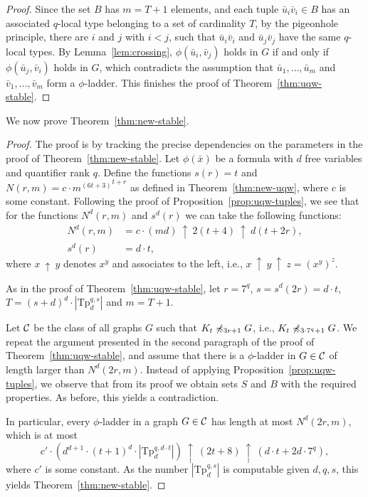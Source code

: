 \begin{proof}
Since the set $B$ has $m=T+1$ elements,
and each tuple $\bar u_i\bar v_i\in B$ has an associated $q$-local type 
belonging to a set of cardinality $T$, 
by the pigeonhole principle, there are $i$ and $j$ 
with $i<j$, such that $\bar u_i\bar v_i$ and $\bar u_j\bar v_j$ 
 have the same $q$-local types. By Lemma~\ref{lem:crossing},   $\phi(\bar u_i,\bar v_j)$ holds in $G$
 if and only if $\phi(\bar u_j,\bar v_i)$ holds in $G$, which contradicts the assumption that $\bar u_1,\ldots,\bar u_m$ and $\bar v_1,\ldots,\bar v_m$ form a $\phi$-ladder.
 This finishes the proof of Theorem~\ref{thm:uqw-stable}.
\end{proof}


We now prove Theorem~\ref{thm:new-stable}.
\begin{proof}
	The proof is by tracking the precise dependencies on the parameters in the proof of Theorem~\ref{thm:new-stable}. 
	Let $\phi(\bar x)$ be a formula with $d$ free variables and quantifier rank $q$.
 Define the functions
	$s(r)=t$ and $N(r,m)=c\cdot {m^{(6t+3)}}^{t+r}$ as defined in Theorem~\ref{thm:new-uqw},
	where $c$ is some constant. 
	Following the proof of Proposition~\ref{prop:uqw-tuples}, we see that for the functions $N^d(r,m)$ and $s^d(r)$ we can take the following functions:%
		\newcommand{\pow}{\ \uparrow\ }%
	\begin{align*}
	 N^d(r,m)&= c\cdot (m d)\pow{2(t+4)\pow{d(t+2r)}},\\
	  s^d(r)&= d\cdot t,
	\end{align*}
where $x\pow y$ denotes $x^y$ and associates to the left, i.e., $x\pow y\pow z=(x^y)^z$.
	
As in the proof of Theorem~\ref{thm:uqw-stable}, let $r=7^q$,  
$s=s^d(2r)=d\cdot t$,  $T=(s+d)^d\cdot |\mathrm{Tp}_d^{q,s}|$ and $m=T+1$.

Let $\cal C$ be the class of all graphs $G$
such that $K_t\not\minor_{3r+1} G$, i.e., $K_t\not\minor_{3\cdot 7^q+1} G$. We repeat the argument presented in the second paragraph of the proof of Theorem~\ref{thm:uqw-stable}, and assume that there is a $\phi$-ladder in $G\in \cal C$ of length larger than $N^d(2r,m)$.
 Instead of applying Proposition~\ref{prop:uqw-tuples},
we observe that from its proof we obtain sets  $S$ and $B$ with the required properties. As before, this yields a contradiction. 


In particular, every $\phi$-ladder in a graph $G\in \cal C$ has length at most $N^d(2r,m)$, 
which is at most $$c'\cdot (d^{d+1}\cdot (t+1)^d\cdot |\mathrm{Tp}_d^{q,d\cdot t}|)\pow(2t+8)\pow(d\cdot t+2d\cdot 7^q),$$
where $c'$ is some constant.
As the number $|\mathrm{Tp}_d^{q,s}|$ is computable given $d,q,s$, this 
 yields Theorem~\ref{thm:new-stable}.
\end{proof}
